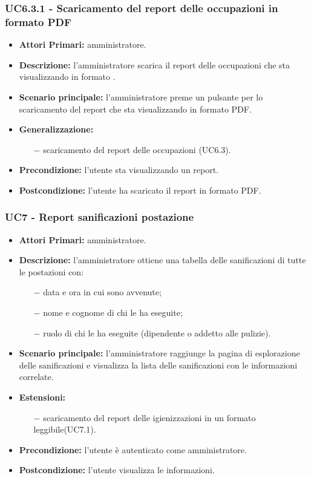 \subsubsection{ UC6.3.1 - Scaricamento del report delle occupazioni in formato PDF}
\begin{itemize}
	\item\textbf{Attori Primari:} 
	amministratore.
	\item\textbf{Descrizione:} 
	l'amministratore scarica il report delle occupazioni che sta visualizzando in formato .
	\item\textbf{Scenario principale:} 
	l'amministratore preme un pulsante per lo scaricamento del report che sta visualizzando in formato PDF.
	\item\textbf{Generalizzazione:}
	\begin{itemize}
		\item[$-$] scaricamento del report delle occupazioni (UC6.3).
	\end{itemize}
	\item\textbf{Precondizione:} 
	l'utente sta visualizzando un report.
	\item\textbf{Postcondizione:}
	l'utente ha scaricato il report in formato PDF.
\end{itemize}





\subsubsection{ UC7 - Report sanificazioni postazione}
\begin{itemize}
           	\item\textbf{Attori Primari:} 
           	amministratore.
           	\item\textbf{Descrizione:} 
           	l'amministratore ottiene una tabella delle sanificazioni di tutte le postazioni con:
           	\begin{itemize}
           		\item[$-$] data e ora in cui sono avvenute;
           		\item[$-$] nome e cognome di chi le ha eseguite;
           		\item[$-$] ruolo di chi le ha eseguite (dipendente o addetto alle pulizie).
           	\end{itemize}
           	\item\textbf{Scenario principale:} 
           	l'amministratore raggiunge la pagina di esplorazione delle sanificazioni e visualizza la lista delle sanificazioni con le informazioni correlate.
			\item\textbf{Estensioni:}
			\begin{itemize}
				\item[$-$] scaricamento del report delle igienizzazioni in un formato leggibile(UC7.1).
			\end{itemize}
           	\item\textbf{Precondizione:} 
           	l'utente è autenticato come amministratore.
           	\item\textbf{Postcondizione:}
           	l'utente visualizza le informazioni.
\end{itemize}

